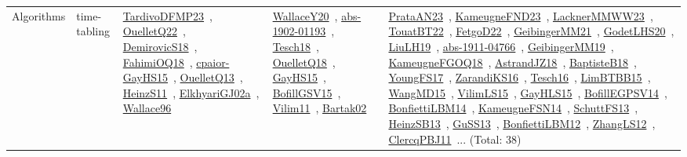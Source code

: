 {\begin{longtable}{lp{3cm}>{\raggedright\arraybackslash}p{6cm}>{\raggedright\arraybackslash}p{6cm}>{\raggedright\arraybackslash}p{8cm}}
Algorithms & time-tabling & \href{papers/TardivoDFMP23.pdf}{TardivoDFMP23}~\cite{TardivoDFMP23}, \href{papers/OuelletQ22.pdf}{OuelletQ22}~\cite{OuelletQ22}, \href{papers/DemirovicS18.pdf}{DemirovicS18}~\cite{DemirovicS18}, \href{articles/FahimiOQ18.pdf}{FahimiOQ18}~\cite{FahimiOQ18}, \href{papers/cpaior-GayHS15.pdf}{cpaior-GayHS15}~\cite{cpaior-GayHS15}, \href{papers/OuelletQ13.pdf}{OuelletQ13}~\cite{OuelletQ13}, \href{papers/HeinzS11.pdf}{HeinzS11}~\cite{HeinzS11}, \href{papers/ElkhyariGJ02a.pdf}{ElkhyariGJ02a}~\cite{ElkhyariGJ02a}, \href{articles/Wallace96.pdf}{Wallace96}~\cite{Wallace96} & \href{articles/WallaceY20.pdf}{WallaceY20}~\cite{WallaceY20}, \href{articles/abs-1902-01193.pdf}{abs-1902-01193}~\cite{abs-1902-01193}, \href{papers/Tesch18.pdf}{Tesch18}~\cite{Tesch18}, \href{papers/OuelletQ18.pdf}{OuelletQ18}~\cite{OuelletQ18}, \href{papers/GayHS15.pdf}{GayHS15}~\cite{GayHS15}, \href{papers/BofillGSV15.pdf}{BofillGSV15}~\cite{BofillGSV15}, \href{papers/Vilim11.pdf}{Vilim11}~\cite{Vilim11}, \href{papers/Bartak02.pdf}{Bartak02}~\cite{Bartak02} & \href{articles/PrataAN23.pdf}{PrataAN23}~\cite{PrataAN23}, \href{papers/KameugneFND23.pdf}{KameugneFND23}~\cite{KameugneFND23}, \href{articles/LacknerMMWW23.pdf}{LacknerMMWW23}~\cite{LacknerMMWW23}, \href{papers/TouatBT22.pdf}{TouatBT22}~\cite{TouatBT22}, \href{articles/FetgoD22.pdf}{FetgoD22}~\cite{FetgoD22}, \href{papers/GeibingerMM21.pdf}{GeibingerMM21}~\cite{GeibingerMM21}, \href{papers/GodetLHS20.pdf}{GodetLHS20}~\cite{GodetLHS20}, \href{papers/LiuLH19.pdf}{LiuLH19}~\cite{LiuLH19}, \href{articles/abs-1911-04766.pdf}{abs-1911-04766}~\cite{abs-1911-04766}, \href{papers/GeibingerMM19.pdf}{GeibingerMM19}~\cite{GeibingerMM19}, \href{papers/KameugneFGOQ18.pdf}{KameugneFGOQ18}~\cite{KameugneFGOQ18}, \href{papers/AstrandJZ18.pdf}{AstrandJZ18}~\cite{AstrandJZ18}, \href{articles/BaptisteB18.pdf}{BaptisteB18}~\cite{BaptisteB18}, \href{papers/YoungFS17.pdf}{YoungFS17}~\cite{YoungFS17}, \href{articles/ZarandiKS16.pdf}{ZarandiKS16}~\cite{ZarandiKS16}, \href{papers/Tesch16.pdf}{Tesch16}~\cite{Tesch16}, \href{papers/LimBTBB15.pdf}{LimBTBB15}~\cite{LimBTBB15}, \href{articles/WangMD15.pdf}{WangMD15}~\cite{WangMD15}, \href{papers/VilimLS15.pdf}{VilimLS15}~\cite{VilimLS15}, \href{papers/GayHLS15.pdf}{GayHLS15}~\cite{GayHLS15}, \href{papers/BofillEGPSV14.pdf}{BofillEGPSV14}~\cite{BofillEGPSV14}, \href{articles/BonfiettiLBM14.pdf}{BonfiettiLBM14}~\cite{BonfiettiLBM14}, \href{articles/KameugneFSN14.pdf}{KameugneFSN14}~\cite{KameugneFSN14}, \href{papers/SchuttFS13.pdf}{SchuttFS13}~\cite{SchuttFS13}, \href{articles/HeinzSB13.pdf}{HeinzSB13}~\cite{HeinzSB13}, \href{papers/GuSS13.pdf}{GuSS13}~\cite{GuSS13}, \href{papers/BonfiettiLBM12.pdf}{BonfiettiLBM12}~\cite{BonfiettiLBM12}, \href{papers/ZhangLS12.pdf}{ZhangLS12}~\cite{ZhangLS12}, \href{papers/ClercqPBJ11.pdf}{ClercqPBJ11}~\cite{ClercqPBJ11}... (Total: 38)\\
\end{longtable}
}

